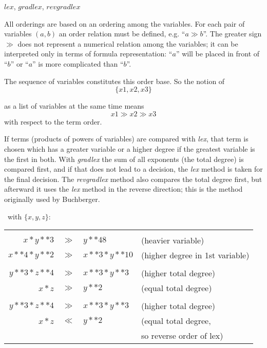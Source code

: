 \begin{center}
$lex$, $gradlex$, $revgradlex$
\end{center}

All orderings are based on an ordering among the variables. For
each pair of variables $(a,b)$ an order relation must be defined, e.g.
``$ a\gg b $''. The greater sign $\gg$  does not represent a numerical
relation among the variables; it can be interpreted only in terms of
formula representation: ``$a$'' will be placed in front of ``$b$'' or
``$a$''  is more complicated than ``$b$''.

The sequence of variables constitutes this order base. So the notion
of
\[ \{x1,x2,x3\} \]

as a list of variables at the same time means
\[ x1 \gg x2 \gg x3 \]
with respect to the term order.

If terms (products of powers of variables) are compared with \emph{lex},
that term is chosen which has a greater variable or a higher degree
if the greatest variable is the first in both. With \emph{gradlex} the sum of
all exponents (the total degree) is compared first, and if that does
not lead to a decision, the \emph{lex} method is taken for the final decision.
The \emph{revgradlex} method also compares the total degree first, but
afterward it uses the \emph{lex} method in the reverse direction; this is the
method originally used by Buchberger.

\example \ with $\{x,y,z\}$: 

\begin{center}
\begin{tabular}{@{}rlll}
  \multicolumn{2}{l}{\hspace*{-1cm}{\bf lex:}} \\
  $x * y**3$    & $\gg$ & $y**48$ & (heavier variable) \\
  $x**4 * y**2$ & $\gg$ & $x**3 * y**10$ & (higher degree in 1st variable) \\[2mm]
  \multicolumn{2}{l}{\hspace*{-1cm}{\bf gradlex:}} \\
  $y**3 * z**4$ & $\gg$ & $x**3 * y**3$ & (higher total degree) \\
  $x*z$         & $\gg$ & $y**2$ & (equal total degree) \\[2mm]
  \multicolumn{2}{l}{\hspace*{-1cm}{\bf revgradlex:}} \\
  $y**3 * z**4$ & $\gg$ & $x**3 * y**3$ & (higher total degree) \\
  $x*z$         & $\ll$ & $y**2$ & (equal total degree, \\
                &       &        & so reverse order of lex)
\end{tabular}
\end{center}

